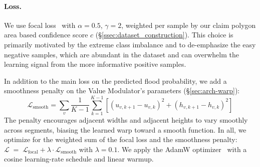 \paragraph{Loss.} We use focal loss~\cite{lin_focal_2020} with $\alpha = 0.5$, $\gamma = 2$, weighted per sample by our claim polygon area based confidence score $c$ (\S\ref{ssec:dataset_construction}).
% 
This choice is primarily motivated by the extreme class imbalance and to de-emphasize the easy negative samples, which are abundant in the dataset and can overwhelm the learning signal from the more informative positive samples.
%

In addition to the main loss on the predicted flood probability, we add a smoothness penalty on the Value Modulator's parameters (\S\ref{sec:arch-warp}):
\[\mathcal{L}_{\text{smooth}}=\sum_{v} \frac{1}{K-1} \sum_{k=1}^{K-1} \left[(u_{v,k+1} - u_{v,k})^2 + (h_{v,k+1} - h_{v,k})^2\right]\]
%
The penalty encourages adjacent widths and adjacent heights to vary smoothly across segments, biasing the learned warp toward a smooth function.
% 
In all, we optimize for the weighted sum of the focal loss and the smoothness penalty:
$\mathcal{L} \;=\; \mathcal{L}_{\text{focal}} + \lambda\cdot\mathcal{L}_{\text{smooth}}$ with $\lambda = 0.1$.
We apply the AdamW optimizer~\cite{loshchilov_decoupled_2019} with a cosine learning-rate schedule and linear warmup.



%

